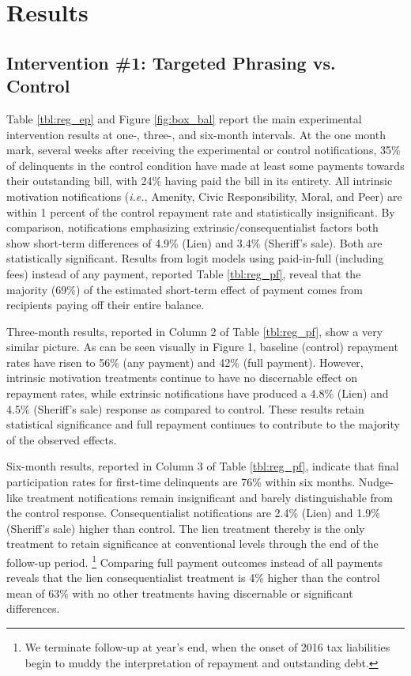 \documentclass[12pt,titlepage]{article}
\begin{document}
\section{Results}

\subsection{Intervention \#1: Targeted Phrasing vs. Control}

Table \ref{tbl:reg_ep} and Figure \ref{fig:box_bal} report the main experimental intervention results 
at one-, three-, and six-month intervals. At the one month mark, 
several weeks after receiving the experimental or control notifications, 
35\% of delinquents in the control condition have made at least some payments 
towards their outstanding bill, with 24\% having paid the bill in its entirety.
All intrinsic motivation notifications (\textit{i.e.}, Amenity, Civic Responsibility, 
Moral, and Peer) are within 1 percent of the control repayment rate and 
statistically insignificant. By comparison, notifications emphasizing 
extrinsic/consequentialist factors both show short-term differences of 
4.9\% (Lien) and 3.4\% (Sheriff's sale). Both are statistically significant. 
Results from logit models using paid-in-full (including fees) instead of any 
payment, reported Table \ref{tbl:reg_pf}, reveal that the majority (69\%) of the estimated 
short-term effect of payment comes from recipients paying off their entire balance.

Three-month results, reported in Column 2 of Table \ref{tbl:reg_pf}, show a very 
similar picture. As can be seen visually in Figure 1, baseline (control) 
repayment rates have risen to 56\% (any payment) and 42\% (full payment). 
However, intrinsic motivation treatments continue to have no discernable 
effect on repayment rates, while extrinsic notifications have produced a 
4.8\% (Lien) and 4.5\% (Sheriff's sale) response as compared to control. These 
results retain statistical significance and full repayment continues to 
contribute to the majority of the observed effects.

Six-month results, reported in Column 3 of Table \ref{tbl:reg_pf}, indicate that final 
participation rates for first-time delinquents are 76\% within six months. 
Nudge-like treatment notifications remain insignificant and barely 
distinguishable from the control response. Consequentialist notifications 
are 2.4\% (Lien) and 1.9\% (Sheriff's sale) higher than control. The lien treatment 
thereby is the only treatment to retain significance at conventional 
levels through the end of the follow-up period.
\footnote{
	We terminate follow-up at year's end, when the onset of 2016 tax liabilities 
	begin to muddy the interpretation of repayment and outstanding debt.
}
Comparing full payment 
outcomes instead of all payments reveals that the lien consequentialist 
treatment is 4\% higher than the control mean of 63\% with no other 
treatments having discernable or significant differences.
\end{document}
